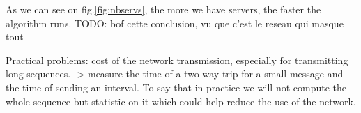 \documentclass[a4paper,10pt]{article}
\newcommand{\todo}[1]{{\color{red} TODO: {#1}}}
\begin{document}
As we can see on fig.\ref{fig:nbservs}, the more we have servers, the faster the algorithm runs.
\todo{bof cette conclusion, vu que c'est le reseau qui masque tout}

Practical problems: cost of the network transmission, especially for transmitting long sequences.
-> measure the time of a two way trip for a small message and the time of sending an interval.
To say that in practice we will not compute the whole sequence but statistic on it which could help
reduce the use of the network.




\end{document}
